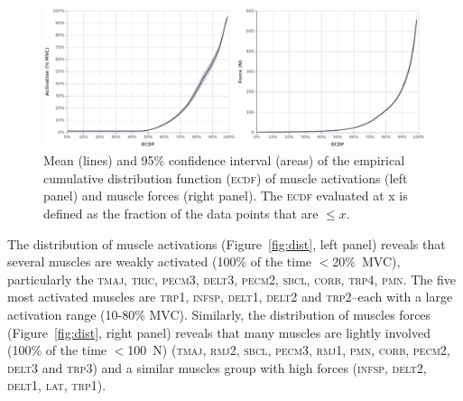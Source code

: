 \begin{figure}[H]
    \centering\includegraphics[width=1\linewidth]{fig/ecdf_general.pdf}
    \caption{Mean (lines) and 95\% confidence interval (areas) of the empirical cumulative distribution function (\textsc{ecdf}) of muscle activations (left panel) and muscle forces (right panel).
    The \textsc{ecdf} evaluated at x is defined as the fraction of the data points that are $\leq x$.}
    \label{fig:general_ecdf}
\end{figure}

The distribution of muscle activations (Figure~\ref{fig:dist}, left panel) reveals that several muscles are weakly activated (100\% of the time $<$20\%~MVC), particularly the \textsc{tmaj}, \textsc{tric}, \textsc{pecm}3, \textsc{delt}3, \textsc{pecm}2, \textsc{sbcl}, \textsc{corb}, \textsc{trp}4, \textsc{pmn}.
The five most activated muscles are \textsc{trp}1, \textsc{infsp}, \textsc{delt}1, \textsc{delt}2 and \textsc{trp}2--each with a large activation range (10-80\% MVC).
Similarly, the distribution of muscles forces (Figure~\ref{fig:dist}, right panel) reveals that many muscles are lightly involved (100\% of the time $<$100~N) (\textsc{tmaj}, \textsc{rmj}2, \textsc{sbcl}, \textsc{pecm}3, \textsc{rmj}1, \textsc{pmn}, \textsc{corb}, \textsc{pecm}2, \textsc{delt}3 and \textsc{trp}3) and a similar muscles group with high forces (\textsc{infsp}, \textsc{delt}2, \textsc{delt}1, \textsc{lat}, \textsc{trp}1).

